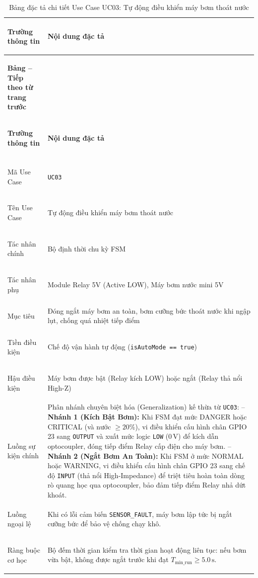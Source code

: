 \begingroup
\small
\renewcommand{\arraystretch}{1.2}
\begin{xltabular}{\textwidth}{|>{\bfseries\raggedright\arraybackslash}p{3.2cm}|X|}
\caption{Bảng đặc tả chi tiết Use Case UC03: Tự động điều khiển máy bơm thoát nước} \label{tab:spec_uc03} \\
\hline
\textbf{Trường thông tin} & \textbf{Nội dung đặc tả} \\ \hline
\endfirsthead

{{\bfseries Bảng \thetable{} -- Tiếp theo từ trang trước}} \\
\hline
\textbf{Trường thông tin} & \textbf{Nội dung đặc tả} \\ \hline
\endhead

\hline {} \\ \hline
\endfoot

\hline
\endlastfoot
Mã Use Case & \texttt{UC03} \\ \hline
Tên Use Case & Tự động điều khiển máy bơm thoát nước \\ \hline
Tác nhân chính & Bộ định thời chu kỳ FSM \\ \hline
Tác nhân phụ & Module Relay 5V (Active LOW), Máy bơm nước mini 5V \\ \hline
Mục tiêu & Đóng ngắt máy bơm an toàn, bơm cưỡng bức thoát nước khi ngập lụt, chống quá nhiệt tiếp điểm \\ \hline
Tiền điều kiện & Chế độ vận hành tự động (\texttt{isAutoMode == true}) \\ \hline
Hậu điều kiện & Máy bơm được bật (Relay kích LOW) hoặc ngắt (Relay thả nổi High-Z) \\ \hline
Luồng sự kiện chính & 
Phân nhánh chuyên biệt hóa (Generalization) kế thừa từ \texttt{UC03}: \newline
-- \textbf{Nhánh 1 (Kích Bật Bơm):} Khi FSM đạt mức DANGER hoặc CRITICAL (và nước $\ge 20\%$), vi điều khiển cấu hình chân GPIO 23 sang \texttt{OUTPUT} và xuất mức logic \texttt{LOW} ($0\,\text{V}$) để kích dẫn optocoupler, đóng tiếp điểm Relay cấp điện cho máy bơm. \newline
-- \textbf{Nhánh 2 (Ngắt Bơm An Toàn):} Khi FSM ở mức NORMAL hoặc WARNING, vi điều khiển cấu hình chân GPIO 23 sang chế độ \texttt{INPUT} (thả nổi High-Impedance) để triệt tiêu hoàn toàn dòng rò quang học qua optocoupler, bảo đảm tiếp điểm Relay nhả dứt khoát. \\ \hline
Luồng ngoại lệ & Khi có lỗi cảm biến \texttt{SENSOR\_FAULT}, máy bơm lập tức bị ngắt cưỡng bức để bảo vệ chống chạy khô. \\ \hline
Ràng buộc cơ học & Bộ đếm thời gian kiểm tra thời gian hoạt động liên tục: nếu bơm vừa bật, không được ngắt trước khi đạt $T_{\text{min\_run}} \ge 5.0\,\text{s}$. \\ \hline

\end{xltabular}
\endgroup

